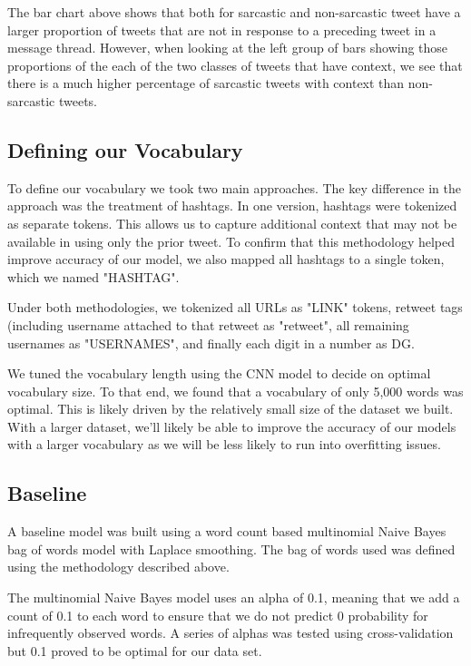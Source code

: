 \documentclass[11pt,a4paper]{article}
\begin{document}
The bar chart above shows that both for sarcastic and non-sarcastic tweet have a larger proportion of tweets that are not in response to a preceding tweet in a message thread.  However, when looking at the left group of bars showing those proportions of the each of the two classes of tweets that have context, we see that there is a much higher percentage of sarcastic tweets with context than non-sarcastic tweets.

\subsection{Defining our Vocabulary}

To define our vocabulary we took two main approaches. The key difference in the approach was the treatment of hashtags. In one version, hashtags were tokenized as separate tokens. This allows us to capture additional context that may not be available in using only the prior tweet. To confirm that this methodology helped improve accuracy of our model, we also mapped all hashtags to a single token, which we named "HASHTAG". 

Under both methodologies, we tokenized all URLs as "LINK" tokens, retweet tags (including username attached to that retweet as "retweet", all remaining usernames as "USERNAMES", and finally each digit in a number as DG. 

We tuned the vocabulary length using the CNN model to decide on optimal vocabulary size. To that end, we found that a vocabulary of only 5,000 words was optimal. This is likely driven by the relatively small size of the dataset we built. With a larger dataset, we'll likely be able to improve the accuracy of our models with a larger vocabulary as we will be less likely to run into overfitting issues.

\subsection{Baseline}
A baseline model was built using a word count based multinomial Naive Bayes bag of words model with Laplace smoothing. The bag of words used was defined using the methodology described above. 

The multinomial Naive Bayes model uses an alpha of 0.1, meaning that we add a count of 0.1 to each word to ensure that we do not predict 0 probability for infrequently observed words. A series of alphas was tested using cross-validation but 0.1 proved to be optimal for our data set.
\end{document}
